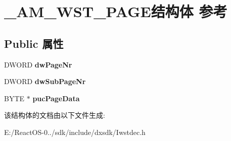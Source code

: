 \hypertarget{struct___a_m___w_s_t___p_a_g_e}{}\section{\+\_\+\+A\+M\+\_\+\+W\+S\+T\+\_\+\+P\+A\+G\+E结构体 参考}
\label{struct___a_m___w_s_t___p_a_g_e}
\subsection*{Public 属性}
\begin{DoxyCompactItemize}
\item 
\mbox{\label{struct___a_m___w_s_t___p_a_g_e_af9c446e2131047ba5d095904e70ab33d}} 
D\+W\+O\+RD {\bfseries dw\+Page\+Nr}
\item 
\mbox{\label{struct___a_m___w_s_t___p_a_g_e_ae715cbf90af44d561364194174e09845}} 
D\+W\+O\+RD {\bfseries dw\+Sub\+Page\+Nr}
\item 
\mbox{\label{struct___a_m___w_s_t___p_a_g_e_a762b28be8b31bf4a3d25b69c3c1f1178}} 
B\+Y\+TE $\ast$ {\bfseries puc\+Page\+Data}
\end{DoxyCompactItemize}


该结构体的文档由以下文件生成\+:\begin{DoxyCompactItemize}
\item 
E\+:/\+React\+O\+S-\/0../sdk/include/dxsdk/Iwstdec.\+h\end{DoxyCompactItemize}
